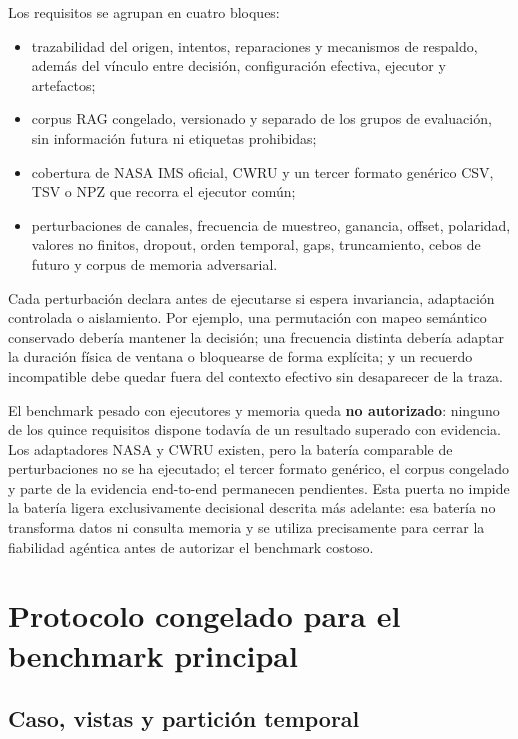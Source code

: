 Los requisitos se agrupan en cuatro bloques:

\begin{itemize}
  \item trazabilidad del origen, intentos, reparaciones y mecanismos de
        respaldo, además del vínculo entre decisión, configuración efectiva,
        ejecutor y artefactos;
  \item corpus RAG congelado, versionado y separado de los grupos de evaluación,
        sin información futura ni etiquetas prohibidas;
  \item cobertura de NASA IMS oficial, CWRU y un tercer formato genérico CSV,
        TSV o NPZ que recorra el ejecutor común;
  \item perturbaciones de canales, frecuencia de muestreo, ganancia, offset,
        polaridad, valores no finitos, dropout, orden temporal, gaps,
        truncamiento, cebos de futuro y corpus de memoria adversarial.
\end{itemize}

Cada perturbación declara antes de ejecutarse si espera invariancia, adaptación
controlada o aislamiento. Por ejemplo, una permutación con mapeo semántico
conservado debería mantener la decisión; una frecuencia distinta debería
adaptar la duración física de ventana o bloquearse de forma explícita; y un
recuerdo incompatible debe quedar fuera del contexto efectivo sin desaparecer
de la traza.

El benchmark pesado con ejecutores y memoria queda \textbf{no autorizado}:
ninguno de los quince requisitos dispone todavía de un resultado superado con
evidencia. Los adaptadores NASA y CWRU existen, pero la batería comparable de
perturbaciones no se ha ejecutado; el tercer formato genérico, el corpus
congelado y parte de la evidencia end-to-end permanecen pendientes. Esta puerta
no impide la batería ligera exclusivamente decisional descrita más adelante:
esa batería no transforma datos ni consulta memoria y se utiliza precisamente
para cerrar la fiabilidad agéntica antes de autorizar el benchmark costoso.

\section{Protocolo congelado para el benchmark principal}

\subsection{Caso, vistas y partición temporal}


